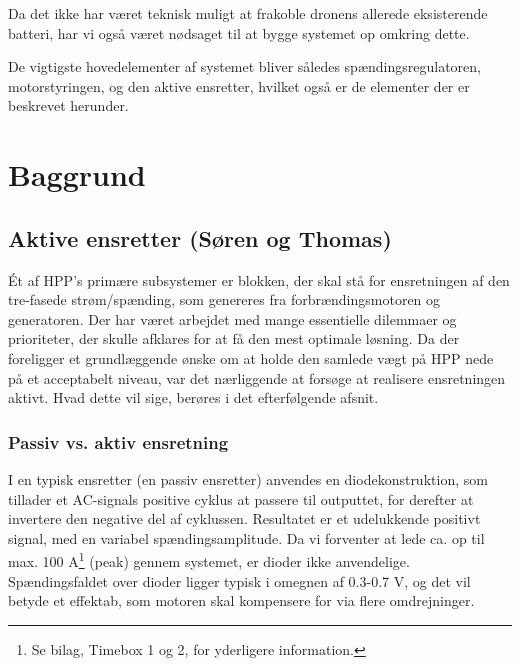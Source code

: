Da det ikke har været teknisk muligt at frakoble dronens allerede eksisterende batteri, har vi også været nødsaget til at bygge systemet op omkring dette. 

De vigtigste hovedelementer af systemet bliver således spændingsregulatoren, motorstyringen, og den aktive ensretter, hvilket også er de elementer der er beskrevet herunder.

\chapter{Baggrund}
\label{sec:baggrund}

\section{Aktive ensretter (Søren og Thomas)}
\label{sec:aktive-ensretter}

Ét af HPP’s primære subsystemer er blokken, der skal stå for ensretningen af den tre-fasede strøm/spænding, som genereres fra forbrændingsmotoren og generatoren. Der har været arbejdet med  mange essentielle dilemmaer og prioriteter, der skulle afklares for at få den mest optimale løsning. Da der foreligger et grundlæggende ønske om at holde den samlede vægt på HPP nede på et acceptabelt niveau, var det nærliggende at forsøge at realisere ensretningen aktivt. Hvad dette vil sige, berøres i det efterfølgende afsnit.

\subsection{Passiv vs. aktiv ensretning}
\label{sec:passiv-vs.-aktiv}

I en typisk ensretter (en passiv ensretter) anvendes en diodekonstruktion, som tillader et AC-signals positive cyklus at passere til outputtet, for derefter at invertere den negative del af cyklussen. Resultatet er et udelukkende positivt signal, med en variabel spændingsamplitude. Da vi forventer at lede ca. op til max. 100 A\footnote{Se bilag, Timebox 1 og 2, for yderligere information.} (peak) gennem systemet, er dioder ikke anvendelige. Spændingsfaldet over dioder ligger typisk i omegnen af 0.3-0.7 V, og det vil betyde et effektab, som motoren skal kompensere for via flere omdrejninger.

